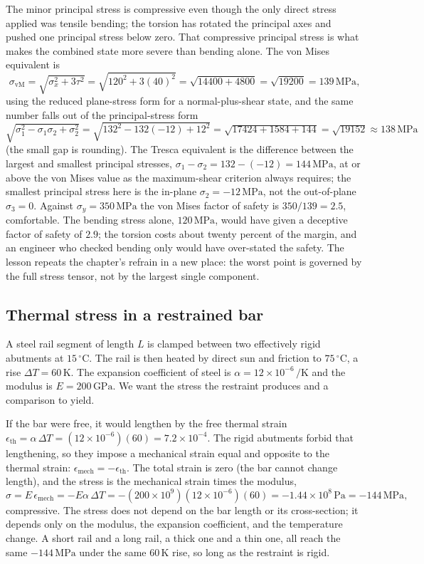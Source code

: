 The minor principal stress is compressive even though the only direct
stress applied was tensile bending; the torsion has rotated the
principal axes and pushed one principal stress below zero. That
compressive principal stress is what makes the combined state more
severe than bending alone. The von Mises equivalent is
\[
\sigma_{\text{vM}} = \sqrt{\sigma_x^2 + 3\tau^2} = \sqrt{120^2 +
3(40)^2} = \sqrt{14400 + 4800} = \sqrt{19200} = 139\,\text{MPa},
\]
using the reduced plane-stress form for a normal-plus-shear state, and
the same number falls out of the principal-stress form $\sqrt{\sigma_1^2
- \sigma_1\sigma_2 + \sigma_2^2} = \sqrt{132^2 - 132(-12) + 12^2} =
\sqrt{17424 + 1584 + 144} = \sqrt{19152} \approx 138\,\text{MPa}$ (the
small gap is rounding). The Tresca equivalent is the difference between the largest and
smallest principal stresses, $\sigma_1 - \sigma_2 = 132 - (-12) =
144\,\text{MPa}$, at or above the von Mises value as the maximum-shear
criterion always requires; the smallest principal stress here is the
in-plane $\sigma_2 = -12\,\text{MPa}$, not the out-of-plane
$\sigma_3 = 0$. Against $\sigma_y
= 350\,\text{MPa}$ the von Mises factor of safety is $350/139 = 2.5$,
comfortable. The bending stress alone, $120\,\text{MPa}$, would have
given a deceptive factor of safety of $2.9$; the torsion costs about
twenty percent of the margin, and an engineer who checked bending only
would have over-stated the safety. The lesson repeats the chapter's
refrain in a new place: the worst point is governed by the full stress
tensor, not by the largest single component.

\subsection{Thermal stress in a restrained bar}

A steel rail segment of length $L$ is clamped between two
effectively rigid abutments at $15\,{}^{\circ}\mathrm{C}$. The rail is
then heated by direct sun and friction to $75\,{}^{\circ}\mathrm{C}$, a
rise $\Delta T = 60\,\text{K}$. The expansion coefficient of steel is
$\alpha = 12\times 10^{-6}\,\si{\per\kelvin}$ and the modulus is $E =
200\,\text{GPa}$. We want the stress the restraint produces and a
comparison to yield.

If the bar were free, it would lengthen by the free thermal strain
$\epsilon_{\text{th}} = \alpha\,\Delta T = (12\times 10^{-6})(60) =
7.2\times 10^{-4}$. The rigid abutments forbid that lengthening, so
they impose a mechanical strain equal and opposite to the thermal
strain: $\epsilon_{\text{mech}} = -\epsilon_{\text{th}}$. The total
strain is zero (the bar cannot change length), and the stress is the
mechanical strain times the modulus,
\[
\sigma = E\,\epsilon_{\text{mech}} = -E\alpha\,\Delta T = -(200\times
10^9)(12\times 10^{-6})(60) = -1.44\times 10^8\,\text{Pa} = -144\,
\text{MPa},
\]
compressive. The stress does not depend on the bar length or its
cross-section; it depends only on the modulus, the expansion
coefficient, and the temperature change. A short rail and a long rail,
a thick one and a thin one, all reach the same $-144\,\text{MPa}$ under
the same $60\,\text{K}$ rise, so long as the restraint is rigid.

